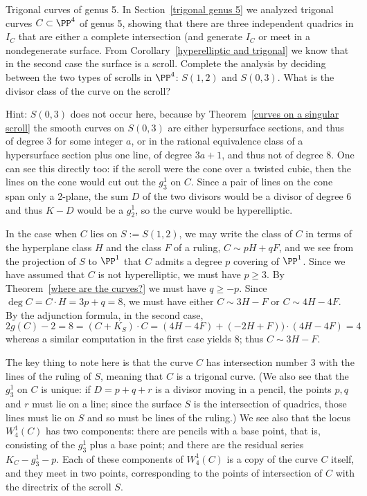 
\begin{exercise} Trigonal curves of genus 5.\label{trigonal genus 5} 
In Section~\ref{trigonal genus 5} we analyzed trigonal curves $C\subset \PP^4$ of genus 5, showing that
there are three independent quadrics in $I_C$ that are either a complete intersection (and generate $I_C$ or
meet in a nondegenerate surface. From Corollary~\ref{hyperelliptic and trigonal} we know that in the second case
the surface is a scroll. Complete the analysis by deciding between the two types of scrolls in $\PP^4$: $S(1,2)$ and $S(0,3)$.
What is the divisor class of the curve on the scroll?

 Hint: $S(0,3)$ does not occur here, because by Theorem~\ref{curves on a singular scroll} the smooth curves on $S(0,3)$ are either hypersurface sections, and thus of degree $3$ for
some integer $a$, or in the rational equivalence class of a hypersurface section plus one line,
of degree $3a+1$, and thus not of degree 8. One can see this directly too: if the scroll were the cone over
a twisted cubic, then the lines on the cone would cut out the $g^1_3$ on $C$. Since a pair of lines on the cone span
only a 2-plane, the sum $D$ of the two divisors would be a divisor of degree 6  and thus $K-D$ would be a $g^1_2$, 
so the curve would be hyperelliptic.

In the case when $C$ lies on $S := S(1,2)$, we may write the class of $C$ in terms of the hyperplane class $H$ and the class $F$ of a ruling, $C\sim pH+qF$, and we see from the 
projection of $S$ to $\PP^1$ that $C$ admits
a degree $p$ covering of $\PP^1$. Since we have assumed that $C$ is not hyperelliptic,
we must have $p\geq 3$. By Theorem~\ref{where are the curves?} we must have
$q\geq -p$. Since $\deg C = C\cdot H = 3p+q = 8$, we must have either 
$C\sim 3H-F$ or $C\sim 4H-4F$. By the adjunction formula, in the second case,
$$
2g(C)-2 = 8 = (C+K_S)\cdot C = (4H-4F)+(-2H+F))\cdot(4H-4F) =4
$$
whereas a similar computation in the first case yields 8; thus $C\sim 3H-F$.

The key thing to note here is that the curve $C$ has intersection number 3 with the lines of the ruling of $S$, meaning that $C$ is a trigonal curve. (We also see that the $g^1_3$ on $C$ is unique: if $D = p + q + r$ is a divisor moving in a pencil, the points $p, q$ and $r$ must lie on a line; since the surface $S$ is the intersection of quadrics, those lines must lie on $S$ and so must be  lines  of the ruling.) We see also that the locus $W^1_4(C)$ has two components: there are pencils with a base point, that is, consisting of the $g^1_3$ plus a base point; and there are the residual series $K_C - g^1_3 - p$. Each of these components of $W^1_4(C)$ is a copy of the curve $C$ itself, and they meet in two points, corresponding to the points of intersection of $C$ with the directrix of the scroll $S$.
\end{exercise}


%





